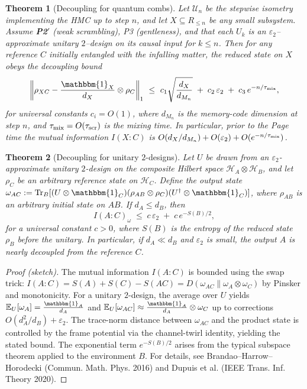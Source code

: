 \documentclass[11pt,a4paper]{article}
\newcommand{\PtwoPrime}{\textbf{P2$'$}\xspace}
\newcommand{\HMC}{\textsc{HMC}\xspace}
\theoremstyle{plain}
\newtheorem{theorem}{Theorem}
\theoremstyle{definition}
\theoremstyle{remark}
\begin{document}
\begin{theorem}[Decoupling for quantum combs]
\label{thm:decoupling}
Let $\mathcal{U}_n$ be the stepwise isometry implementing the \HMC{} up to step $n$, and let $X\subseteq R_{\le n}$ be any small subsystem.
Assume \PtwoPrime{} (weak scrambling), P3 (gentleness), and that each $U_k$ is an $\varepsilon_2$--approximate unitary $2$--design on its causal input for $k\le n$.
Then for any reference $C$ initially entangled with the infalling matter, the reduced state on $X$ obeys the decoupling bound
\[
\left\|\rho_{XC}-\frac{\mathbbm{1}_X}{d_X}\otimes\rho_C\right\|_1 \ \le\ c_1\sqrt{\frac{d_X}{d_{M_n}}} \;+\; c_2\,\varepsilon_2 \;+\; c_3\,e^{-n/\tau_{\rm mix}},
\]
for universal constants $c_i=O(1)$, where $d_{M_n}$ is the memory-code dimension at step $n$, and $\tau_{\rm mix}=O(\tau_{\rm scr})$ is the mixing time.
In particular, prior to the Page time the mutual information $I(X{:}C)$ is $O(d_X/d_{M_n})+O(\varepsilon_2)+O(e^{-n/\tau_{\rm mix}})$.
\end{theorem}

\begin{theorem}[Decoupling for unitary $2$-designs]\label{thm:decoupling-design}
Let $U$ be drawn from an $\varepsilon_2$-approximate unitary $2$-design on the composite Hilbert space $\mathcal{H}_A\otimes\mathcal{H}_B$, and let $\rho_C$ be an arbitrary reference state on $\mathcal{H}_C$. Define the output state $\omega_{AC}:= \mathrm{Tr}_B[(U\otimes\mathbbm{1}_C)(\rho_{AB}\otimes\rho_C)(U^\dagger\otimes\mathbbm{1}_C)]$, where $\rho_{AB}$ is an arbitrary initial state on $AB$. If $d_A\le d_B$, then
\begin{equation}
I(A:C)_\omega \;\le\; c\,\varepsilon_2 \;+\; c\,e^{-S(B)/2},
\end{equation}
for a universal constant $c>0$, where $S(B)$ is the entropy of the reduced state $\rho_B$ before the unitary. In particular, if $d_A\ll d_B$ and $\varepsilon_2$ is small, the output $A$ is nearly decoupled from the reference $C$.
\end{theorem}
\begin{proof}[Proof (sketch)]
The mutual information $I(A:C)$ is bounded using the swap trick: $I(A:C)=S(A)+S(C)-S(AC)=D(\omega_{AC}\|\omega_A\otimes\omega_C)$ by Pinsker and monotonicity. For a unitary $2$-design, the average over $U$ yields $\mathbb{E}_U[\omega_A]=\frac{\mathbbm{1}_A}{d_A}$ and $\mathbb{E}_U[\omega_{AC}]\approx\frac{\mathbbm{1}_A}{d_A}\otimes\omega_C$ up to corrections $O(d_A^2/d_B)+\varepsilon_2$. The trace-norm distance between $\omega_{AC}$ and the product state is controlled by the frame potential via the channel-twirl identity, yielding the stated bound. The exponential term $e^{-S(B)/2}$ arises from the typical subspace theorem applied to the environment $B$. For details, see Brandao--Harrow--Horodecki (Commun. Math. Phys. 2016) and Dupuis et al. (IEEE Trans. Inf. Theory 2020).
\end{proof}
\end{document}
